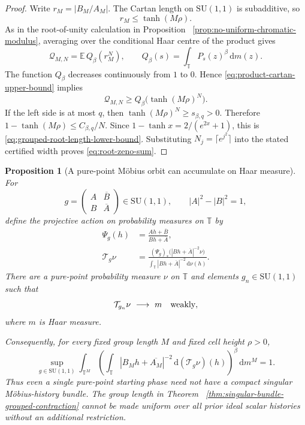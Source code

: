 \documentclass[11pt]{article}
\newtheorem{proposition}[theorem]{Proposition}
\theoremstyle{remark}
\newcommand{\T}{\mathbb T}
\newcommand{\dd}{\,\mathrm d}
\begin{document}
\begin{proof}
Write $r_M=|B_M/A_M|$.  The Cartan length on $\mathrm{SU}(1,1)$ is
subadditive, so
\begin{equation}
 r_M\leq\tanh(M\rho).
 \label{eq:product-cartan-upper-bound}
\end{equation}
As in the root-of-unity calculation in Proposition
~\ref{prop:no-uniform-chromatic-modulus}, averaging over the conditional
Haar centre of the product gives
\begin{equation}
 \mathcal Q_{M,N}
 =\mathbb E\,Q_\beta(r_M^N),
 \qquad
 Q_\beta(s)=\int_\T P_s(z)^\beta\dd m(z).
 \label{eq:grouped-root-collapse}
\end{equation}
The function $Q_\beta$ decreases continuously from $1$ to $0$.  Hence
\eqref{eq:product-cartan-upper-bound} implies
\[
 \mathcal Q_{M,N}
 \geq Q_\beta\bigl(\tanh(M\rho)^N\bigr).
\]
If the left side is at most $q$, then
$\tanh(M\rho)^N\geq s_{\beta,q}>0$.  Therefore
$1-\tanh(M\rho)\leq C_{\beta,q}/N$.  Since
$1-\tanh x=2/(e^{2x}+1)$, this is
\eqref{eq:grouped-root-length-lower-bound}.  Substituting
$N_j=\lceil e^{j^2}\rceil$ into the stated certified width proves
\eqref{eq:root-zeno-sum}.
\end{proof}

\begin{proposition}[A pure-point M\"obius orbit can accumulate on Haar measure]
\label{prop:mobius-orbit-haar-obstruction}
For
\[
 g=\begin{pmatrix}A&\overline B\\B&\overline A\end{pmatrix}
 \in\mathrm{SU}(1,1),
 \qquad |A|^2-|B|^2=1,
\]
define the projective action on probability measures on $\T$ by
\begin{align}
 \Psi_g(h)&=\frac{Ah+\overline B}{Bh+\overline A},
 \label{eq:su11-boundary-action}\\
 \mathcal T_g\nu
 &=
 \frac{(\Psi_g)_*
  \bigl(|Bh+\overline A|^{-2}\nu\bigr)}
 {\displaystyle\int_\T|Bh+\overline A|^{-2}\dd\nu(h)}.
 \label{eq:su11-spectral-measure-action}
\end{align}
There are a pure-point probability measure $\nu$ on $\T$ and elements
$g_n\in\mathrm{SU}(1,1)$ such that
\begin{equation}
 \mathcal T_{g_n}\nu\ \longrightarrow\ m
 \quad\hbox{weakly},
 \label{eq:mobius-orbit-to-haar}
\end{equation}
where $m$ is Haar measure.

Consequently, for every fixed group length $M$ and fixed cell height
$\rho>0$,
\begin{equation}
 \sup_{g\in\mathrm{SU}(1,1)}
 \int_{\T^M}
 \left(
  \int_\T
  |B_Mh+\overline{A_M}|^{-2}
  \dd(\mathcal T_g\nu)(h)
 \right)^\beta
 \dd m^M
 =1.
 \label{eq:no-uniform-mobius-history-contraction}
\end{equation}
Thus even a single pure-point starting phase need not have a compact
singular M\"obius-history bundle.  The group length in Theorem
~\ref{thm:singular-bundle-grouped-contraction} cannot be made uniform over
all prior ideal scalar histories without an additional restriction.
\end{proposition}
\end{document}
